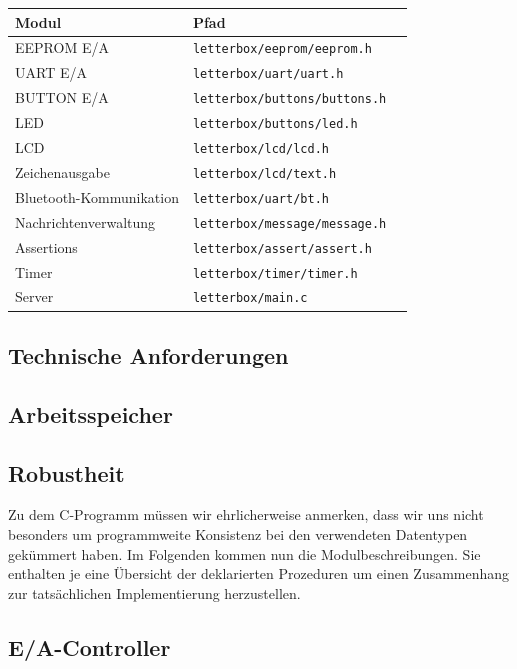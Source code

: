 \documentclass[ngerman]{article}
\begin{document}
\begin{tabular}{|l|l|l|}
    \hline
    {\bf Modul} & {\bf Pfad} & \\
    \hline
    \hline
    EEPROM E/A & {\tt letterbox/eeprom/eeprom.h} & \\
    \hline
    UART E/A & {\tt letterbox/uart/uart.h} & \\
    \hline
    BUTTON E/A & {\tt letterbox/buttons/buttons.h} & \\
    \hline
    LED & {\tt letterbox/buttons/led.h} & \\
    \hline
    LCD & {\tt letterbox/lcd/lcd.h} & \\
    \hline
    Zeichenausgabe & {\tt letterbox/lcd/text.h} & \\
    \hline
    Bluetooth-Kommunikation & {\tt letterbox/uart/bt.h} & \\
    \hline
    Nachrichtenverwaltung & {\tt letterbox/message/message.h} & \\
    \hline
    Assertions & {\tt letterbox/assert/assert.h} &  \\
    \hline
    Timer & {\tt letterbox/timer/timer.h} & \\
    \hline
    Server  & {\tt letterbox/main.c} & \\
    \hline
\end{tabular}


\subsection{Technische Anforderungen}

\subsection{Arbeitsspeicher}

\subsection{Robustheit}

Zu dem C-Programm müssen wir ehrlicherweise anmerken, dass wir uns nicht besonders
um programmweite Konsistenz bei den verwendeten Datentypen ge\-kümmert haben. Im Folgenden
kommen nun die Modulbeschreibungen. Sie enthalten je eine Übersicht der deklarierten
Prozeduren um einen Zusammenhang zur tatsächlichen Implementierung herzustellen.


\subsection{E/A-Controller}
\end{document}
